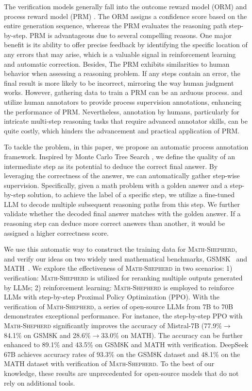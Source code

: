 \documentclass{article} %
\newcommand{\methodname}{\textsc{Math-Shepherd}\xspace}
\begin{document}
The verification models generally fall into the outcome reward model (ORM) \citep{cobbe2021training,ovm} and process reward model (PRM) \citep{li-etal-2023-making,uesato2022solving,lightman2023let,ma2023let}.  The ORM assigns a confidence score based on the entire generation sequence, whereas the PRM evaluates the reasoning path step-by-step.  PRM is advantageous due to several compelling reasons.  One major benefit is its ability to offer precise feedback by identifying the specific location of any errors that may arise, which is a valuable signal in reinforcement learning and automatic correction. Besides, The PRM exhibits similarities to human behavior when assessing a reasoning problem. If any steps contain an error, the final result is more likely to be incorrect, mirroring the way human judgment works. 
However, gathering data to train a PRM can be an arduous process. \cite{uesato2022solving} and \cite{lightman2023let} utilize human annotators to provide process supervision annotations, enhancing the performance of PRM. 
Nevertheless, annotation by humans, particularly for intricate multi-step reasoning tasks that require advanced annotator skills, can be quite costly, which hinders the advancement and practical application of PRM.

To tackle the problem, in this paper, we propose an automatic process annotation framework. Inspired by Monte Carlo Tree Search \citep{kocsis2006bandit,coulom2006efficient,silver2016mastering,swiechowski2023monte}, we define the quality of an intermediate step as its potential to deduce the correct final answer. 
By leveraging the correctness of the answer, we can automatically gather step-wise supervision.  
Specifically, given a math problem with a golden answer and a step-by-step solution, to achieve the label of a specific step, we utilize a fine-tuned LLM to decode multiple subsequent reasoning paths from this step. 
We further validate whether the decoded final answer matches with the golden answer. 
If a reasoning step can deduce more correct answers than another, it would be assigned a higher correctness score.


We use this automatic way to construct the training data for \methodname, and verify our ideas on two widely used mathematical benchmarks, GSM8K~\citep{cobbe2021training} and MATH~\citep{MATH}.
We explore the effectiveness of \methodname in two scenarios:
1) verification:  \methodname is utilized for reranking multiple outputs generated by LLMs;
2) reinforcement learning: \methodname is employed to reinforce LLMs with step-by-step Proximal Policy Optimization (PPO).
With the verification of \methodname, a series of open-source LLMs from 7B to 70B demonstrates exceptional performance. 
For instance, the step-by-step PPO with \methodname significantly improves the accuracy of Mistral-7B (77.9\%$\to$84.1\% on GSM8K and 28.6\%$\to$33.0\% on MATH).
The accuracy can be further enhanced to 89.1\% and 43.5\% on GSM8K and MATH with verification.
DeepSeek 67B \citep{DeepSeek-llm} achieves accuracy rates of 93.3\% on the GSM8K dataset and 48.1\% on the MATH dataset with verification of \methodname.
To the best of our knowledge, these results are unprecedented for open-source models that do not rely on additional tools.
\end{document}
